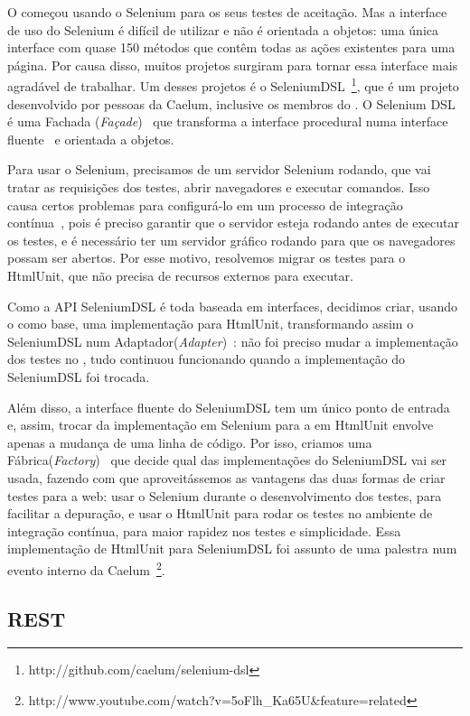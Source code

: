 O \calopsita{} começou usando o Selenium para os seus testes de aceitação. Mas a interface de uso do Selenium é difícil de utilizar e não é orientada a objetos: uma única interface com quase 150 métodos que contêm todas as ações existentes para uma página. Por causa disso, muitos projetos surgiram para tornar essa interface mais agradável de trabalhar. Um desses projetos é o SeleniumDSL~\footnote{http://github.com/caelum/selenium-dsl}, que é um projeto \opensource{} desenvolvido por pessoas da Caelum, inclusive os membros do \calopsita{}. O Selenium DSL é uma Fachada (\textit{Façade})~\cite{gof} que transforma a interface procedural numa interface fluente~\cite{dsl} e orientada a objetos.

Para usar o Selenium, precisamos de um servidor Selenium rodando, que vai tratar as requisições dos testes, abrir navegadores e executar comandos. Isso causa certos problemas para configurá-lo em um processo de integração contínua~\cite{ci}, pois é preciso garantir que o servidor esteja rodando antes de executar os testes, e é necessário ter um servidor gráfico rodando para que os navegadores possam ser abertos. Por esse motivo, resolvemos migrar os testes para o HtmlUnit, que não precisa de recursos externos para executar.

Como a API SeleniumDSL é toda baseada em interfaces, decidimos criar, usando o \calopsita{} como base, uma implementação para HtmlUnit, transformando assim o SeleniumDSL num Adaptador(\textit{Adapter})~\cite{gof}: não foi preciso mudar a implementação dos testes no \calopsita{}, tudo continuou funcionando quando a implementação do SeleniumDSL foi trocada. 

Além disso, a interface fluente do SeleniumDSL tem um único ponto de entrada e, assim, trocar da implementação em Selenium para a em HtmlUnit envolve apenas a mudança de uma linha de código. Por isso, criamos uma Fábrica(\textit{Factory})~\cite{gof} que decide qual das implementações do SeleniumDSL vai ser usada, fazendo com que aproveitássemos as vantagens das duas formas de criar testes para a web: usar o Selenium durante o desenvolvimento dos testes, para facilitar a depuração, e usar o HtmlUnit para rodar os testes no ambiente de integração contínua, para maior rapidez nos testes e simplicidade. Essa implementação de HtmlUnit para SeleniumDSL foi assunto de uma palestra num evento interno da Caelum~\footnote{http://www.youtube.com/watch?v=5oFlh\_Ka65U\&feature=related}.

\subsection{REST}

